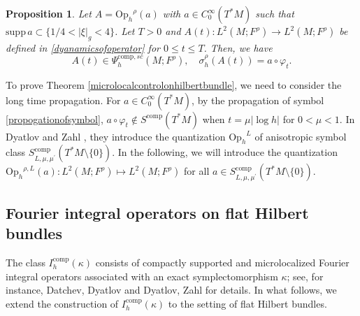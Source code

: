 \documentclass[11pt,oneside,reqno]{amsart}
\newcommand\Oph{\ensuremath{\mathrm{Op}_h}}
\newtheorem{proposition}[theorem]{Proposition}
\theoremstyle{definition}
\numberwithin{equation}{section}
\theoremstyle{plain}
\begin{document}
\begin{proposition}\label{uniformegorovtheorem}
Let $A=\Oph^{\rho}(a)$ with $a\in C_{0}^{\infty}(T^*M)$ such that $\mathrm{supp}\,a\subset \{1 / 4<|\xi|_g<4 \} $. Let $T>0$ and $A(t): L^2(M;F^{\rho})\to L^2(M;F^{\rho})$ be defined in \eqref{dyanamicsofoperator} for $0\leq t\leq T$. Then, we have
\begin{equation}\label{egorov}
A(t) \in \Psi^{\mathrm{comp},sc}_{h}(M;F^\rho), \quad \sigma_{h}^{\rho}(A(t))=a\circ \varphi_{t}.
\end{equation}
\end{proposition}
To prove Theorem \ref{microlocalcontrolonhilbertbundle}, we need to consider the long time propagation. For $a\in C_{0}^{\infty}(T^*M)$, by the propagation of symbol \eqref{propogationofsymbol}, $a\circ \varphi_{t} \notin S^{\mathrm{comp}}(T^*M)$ when $t=\mu|\log h|$ for $0<\mu<1$. In Dyatlov and Zahl \cite{dyatlovzahl2016spectral}, they introduce the quantization $\Oph^{L}$ of anisotropic symbol class $S^{\mathrm{comp}}_{L,\mu,\mu^{\prime}}(T^*M\setminus \{0\})$. In the following, we will introduce the quantization $\Oph^{\rho,L}(a): L^2(M;F^{\rho})\mapsto L^2(M;F^{\rho})$ for all $a \in S^{\mathrm{comp}}_{L,\mu,\mu^{\prime}}(T^*M\setminus \{0\})$. 

\subsection{Fourier integral operators on flat Hilbert bundles}\label{subsec:fio}

The class $I_h^{\mathrm{comp}}(\kappa)$ consists of compactly supported and microlocalized Fourier integral operators associated with an exact symplectomorphism $\kappa$; see, for instance, Datchev, Dyatlov \cite[\S 3.2]{datchev2013fractal} and Dyatlov, Zahl \cite[\S 2.2]{dyatlovzahl2016spectral} for details. In what follows, we extend the construction of $I_h^{\mathrm{comp}}(\kappa)$ to the setting of flat Hilbert bundles. 
\end{document}
